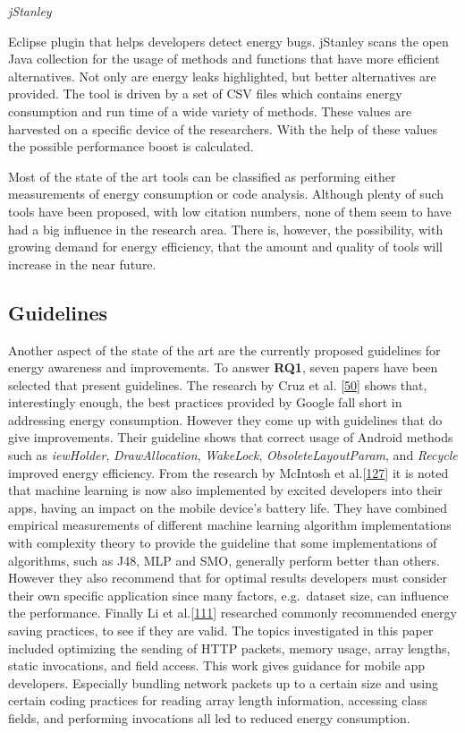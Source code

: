 \documentclass[]{book}
\begin{document}
\emph{jStanley}

Eclipse plugin that helps developers detect energy bugs. jStanley scans
the open Java collection for the usage of methods and functions that
have more efficient alternatives. Not only are energy leaks highlighted,
but better alternatives are provided. The tool is driven by a set of CSV
files which contains energy consumption and run time of a wide variety
of methods. These values are harvested on a specific device of the
researchers. With the help of these values the possible performance
boost is calculated.

Most of the state of the art tools can be classified as performing
either measurements of energy consumption or code analysis. Although
plenty of such tools have been proposed, with low citation numbers, none
of them seem to have had a big influence in the research area. There is,
however, the possibility, with growing demand for energy efficiency,
that the amount and quality of tools will increase in the near future.

\subsection{Guidelines}\label{guidelines}

Another aspect of the state of the art are the currently proposed
guidelines for energy awareness and improvements. To answer
\textbf{RQ1}, seven papers have been selected that present guidelines.
The research by Cruz et al. {[}\protect\hyperlink{ref-CA2017}{50}{]}
shows that, interestingly enough, the best practices provided by Google
fall short in addressing energy consumption. However they come up with
guidelines that do give improvements. Their guideline shows that correct
usage of Android methods such as \emph{iewHolder},
\emph{DrawAllocation}, \emph{WakeLock}, \emph{ObsoleteLayoutParam}, and
\emph{Recycle} improved energy efficiency. From the research by McIntosh
et al.{[}\protect\hyperlink{ref-MSA2018}{127}{]} it is noted that
machine learning is now also implemented by excited developers into
their apps, having an impact on the mobile device's battery life. They
have combined empirical measurements of different machine learning
algorithm implementations with complexity theory to provide the
guideline that some implementations of algorithms, such as J48, MLP and
SMO, generally perform better than others. However they also recommend
that for optimal results developers must consider their own specific
application since many factors, e.g.~dataset size, can influence the
performance. Finally Li et al.{[}\protect\hyperlink{ref-LH2014}{111}{]}
researched commonly recommended energy saving practices, to see if they
are valid. The topics investigated in this paper included optimizing the
sending of HTTP packets, memory usage, array lengths, static
invocations, and field access. This work gives guidance for mobile app
developers. Especially bundling network packets up to a certain size and
using certain coding practices for reading array length information,
accessing class fields, and performing invocations all led to reduced
energy consumption.
\end{document}
